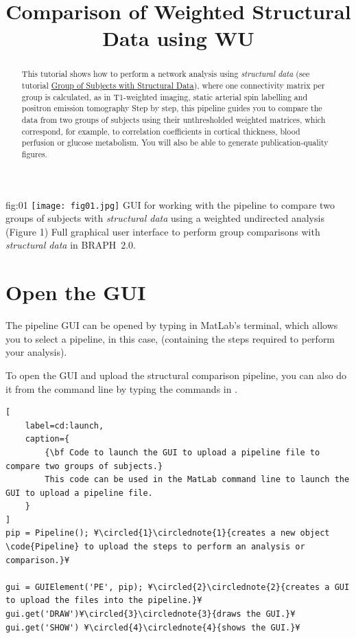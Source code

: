 \documentclass[justified]{tufte-handout}
\title{Comparison of Weighted Structural Data using WU}
\begin{document}
\maketitle

\begin{abstract}
\noindent
This tutorial shows how to perform a network analysis using \emph{structural data} (see tutorial \href{https://github.com/braph-software/BRAPH-2/tree/develop/tutorials/general/tut_gr_st}{Group of Subjects with Structural Data}), where one connectivity matrix per group is calculated, as in T1-weighted imaging, static arterial spin labelling and positron emission tomography Step by step, this pipeline guides you to compare the data from two groups of subjects using their unthresholded weighted matrices, which correspond, for example, to correlation coefficients in cortical thickness, blood perfusion or glucose metabolism. You will also be able to generate publication-quality figures.
\end{abstract}
\tableofcontents

	{fig:01}
	{\texttt{[image: fig01.jpg]}}
	{GUI for working with the pipeline to compare two groups of subjects with \emph{structural data} using a weighted undirected analysis (Figure 1)}
	{
	Full graphical user interface to perform group comparisons with \emph{structural data} in BRAPH~2.0. 
	}

\clearpage
\section{Open the GUI}

The pipeline GUI can be opened by typing  in MatLab's terminal, which allows you to select a pipeline, in this case,  (containing the steps required to perform your analysis).

To open the GUI and upload the structural comparison pipeline, you can also do it from the command line by typing the commands in .
%
\begin{lstlisting}[
	label=cd:launch,
	caption={
		{\bf Code to launch the GUI to upload a pipeline file to compare two groups of subjects.}
		This code can be used in the MatLab command line to launch the GUI to upload a pipeline file.
	}
]
pip = Pipeline(); ¥\circled{1}\circlednote{1}{creates a new object \code{Pipeline} to upload the steps to perform an analysis or comparison.}¥

gui = GUIElement('PE', pip); ¥\circled{2}\circlednote{2}{creates a GUI to upload the files into the pipeline.}¥
gui.get('DRAW')¥\circled{3}\circlednote{3}{draws the GUI.}¥
gui.get('SHOW') ¥\circled{4}\circlednote{4}{shows the GUI.}¥
\end{lstlisting}
\end{document}
